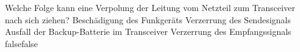     {Welche Folge kann eine Verpolung der Leitung vom Netzteil zum Transceiver nach sich ziehen?}
    {Beschädigung des Funkgeräts}
    {Verzerrung des Sendesignals}
    {Ausfall der Backup-Batterie im Transceiver}
    {Verzerrung des Empfangssignals}
    {false}{false}